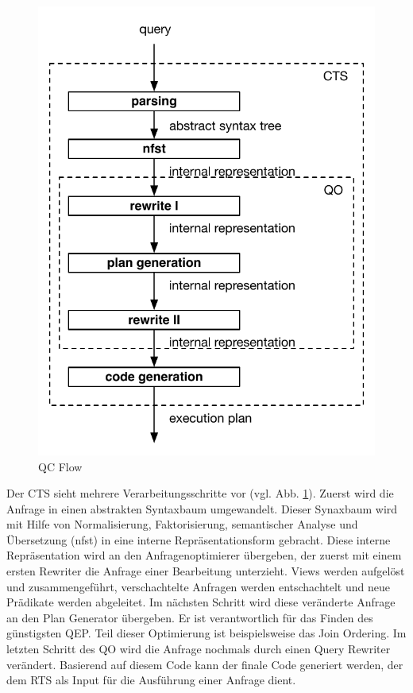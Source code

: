 \begin{figure}[h]
  \centering
  \includegraphics{02_Grundlagen/QCArchitecture.pdf}
  \caption{\ac{QC} Flow}
  \label{DBMS_Interpreter}
\end{figure}


Der \ac{CTS} sieht mehrere Verarbeitungsschritte vor (vgl. Abb. \ref{DBMS_Interpreter}). Zuerst wird die Anfrage in einen abstrakten Syntaxbaum umgewandelt. Dieser Synaxbaum wird mit Hilfe von Normalisierung, Faktorisierung, semantischer Analyse und Übersetzung (nfst) in eine interne Repräsentationsform gebracht. Diese interne Repräsentation wird an den Anfragenoptimierer übergeben, der zuerst mit einem ersten Rewriter die Anfrage einer Bearbeitung unterzieht. Views werden aufgelöst und zusammengeführt, verschachtelte Anfragen werden entschachtelt und neue Prädikate werden abgeleitet. Im nächsten Schritt wird diese veränderte Anfrage an den Plan Generator übergeben. Er ist verantwortlich für das Finden des günstigsten \ac{QEP}. Teil dieser Optimierung ist beispielsweise das Join Ordering. Im letzten Schritt des \ac{QO} wird die Anfrage nochmals durch einen Query Rewriter verändert. Basierend auf diesem Code kann der finale Code generiert werden, der dem \ac{RTS} als Input für die Ausführung einer Anfrage dient.


